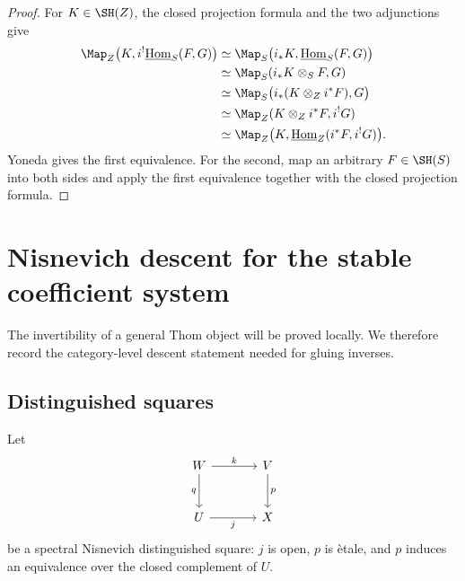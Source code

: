 \begin{proof}
For $K\in\SH(Z)$, the closed projection formula and the two adjunctions give
\[
\begin{aligned}
    \Map_Z\bigl(K,i^!\underline{\operatorname{Hom}}_S(F,G)\bigr)
    &\simeq
    \Map_S\bigl(i_*K,\underline{\operatorname{Hom}}_S(F,G)\bigr) \\
    &\simeq
    \Map_S(i_*K\otimes_SF,G) \\
    &\simeq
    \Map_S\bigl(i_*(K\otimes_Zi^*F),G\bigr) \\
    &\simeq
    \Map_Z(K\otimes_Zi^*F,i^!G) \\
    &\simeq
    \Map_Z\bigl(K,\underline{\operatorname{Hom}}_Z(i^*F,i^!G)\bigr).
\end{aligned}
\]
Yoneda gives the first equivalence.  For the second, map an arbitrary $F\in\SH(S)$ into both sides
and apply the first equivalence together with the closed projection formula.
\end{proof}

\section{Nisnevich descent for the stable coefficient system}
\label{sec:stable-category-descent}

The invertibility of a general Thom object will be proved locally.  We therefore record the
category-level descent statement needed for gluing inverses.

\subsection{Distinguished squares}

Let
\[
\begin{tikzcd}[column sep=large,row sep=large]
    W \arrow[r,"k"] \arrow[d,"q"']
        & V \arrow[d,"p"] \\
    U \arrow[r,"j"'] & X
\end{tikzcd}
\]
be a spectral Nisnevich distinguished square: $j$ is open, $p$ is \`etale, and $p$ induces an
equivalence over the closed complement of $U$.

